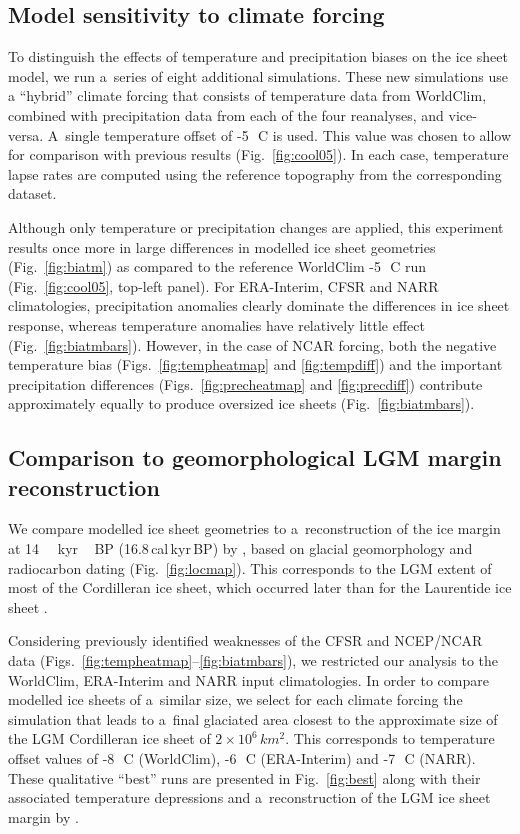 \documentclass[tc, ms]{copernicus}
\begin{document}
\subsection{Model sensitivity to climate forcing}

To distinguish the effects of temperature and precipitation biases on the ice sheet model, we run a~series of eight additional simulations. These new simulations use a ``hybrid'' climate forcing that consists of temperature data from WorldClim, combined with precipitation data from each of the four reanalyses, and vice-versa. A~single temperature offset of -5\,\unit{{\degree}C} is used. This value was chosen to allow for comparison with previous results (Fig.~\ref{fig:cool05}). In each case, temperature lapse rates are computed using the reference topography from the corresponding dataset.

Although only temperature or precipitation changes are applied, this experiment results once more in large differences in modelled ice sheet geometries (Fig.~\ref{fig:biatm}) as compared to the reference WorldClim -5\,\unit{{\degree}C} run (Fig.~\ref{fig:cool05}, top-left panel). For ERA-Interim, CFSR and NARR climatologies, precipitation anomalies clearly dominate the differences in ice sheet response, whereas temperature anomalies have relatively little effect (Fig.~\ref{fig:biatmbars}). However, in the case of NCAR forcing, both the negative temperature bias (Figs.~\ref{fig:tempheatmap} and \ref{fig:tempdiff}) and the important precipitation differences (Figs.~\ref{fig:precheatmap} and \ref{fig:precdiff}) contribute approximately equally to produce oversized ice sheets (Fig.~\ref{fig:biatmbars}).

\subsection{Comparison to geomorphological LGM margin reconstruction}

We compare modelled ice sheet geometries to a~reconstruction of the ice margin at 14\,\unit{\,kyr\,BP} (16.8\,cal\,kyr\,BP) by \citet{dyke-2004}, based on glacial geomorphology and radiocarbon dating (Fig.~\ref{fig:locmap}). This corresponds to the LGM extent of most of the Cordilleran ice sheet, which occurred later than for the Laurentide ice sheet \citep{porter-swanson-1998,dyke-2004,stroeven-etal-2010,stroeven-etal-inpress}.

Considering previously identified weaknesses of the CFSR and NCEP/NCAR data (Figs.~\ref{fig:tempheatmap}--\ref{fig:biatmbars}), we restricted our analysis to the WorldClim, ERA-Interim and NARR input climatologies. In order to compare modelled ice sheets of a~similar size, we select for each climate forcing the simulation that leads to a~final glaciated area closest to the approximate size of the LGM Cordilleran ice sheet of $2\times 10^6\,\unit{km^2}$. This corresponds to temperature offset values of -8\,\unit{{\degree}C} (WorldClim), -6\,\unit{{\degree}C} (ERA-Interim) and -7\,\unit{{\degree}C} (NARR). These qualitative ``best'' runs are presented in Fig.~\ref{fig:best} along with their associated temperature depressions and a~reconstruction of the LGM ice sheet margin by \citet{dyke-2004}.
\end{document}
